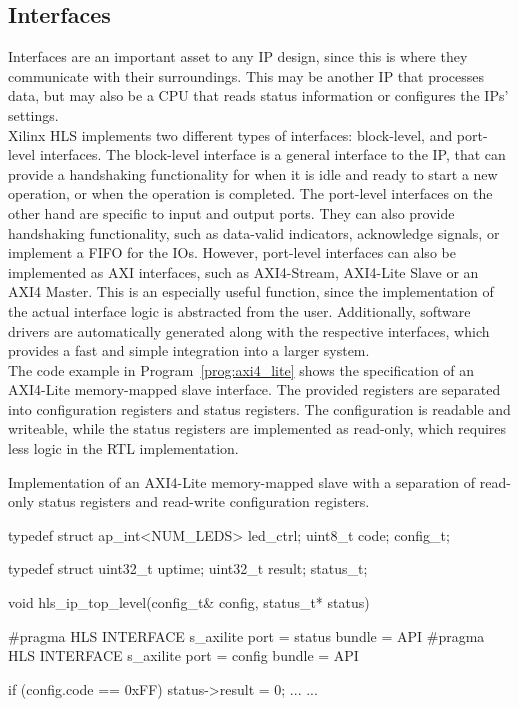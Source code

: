 \subsection{Interfaces}
\label{sec:hls:coding:interfaces}

Interfaces are an important asset to any IP design, since this is where they communicate with their surroundings.
This may be another IP that processes data, but may also be a CPU that reads status information or configures the IPs' settings.\\

Xilinx HLS implements two different types of interfaces: block-level, and port-level interfaces.
The block-level interface is a general interface to the IP, that can provide a handshaking functionality for when it is idle and ready to start a new operation, or when the operation is completed.
The port-level interfaces on the other hand are specific to input and output ports.
They can also provide handshaking functionality, such as data-valid indicators, acknowledge signals, or implement a FIFO for the IOs.
However, port-level interfaces can also be implemented as AXI interfaces, such as AXI4-Stream, AXI4-Lite Slave or an AXI4 Master.
This is an especially useful function, since the implementation of the actual interface logic is abstracted from the user.
Additionally, software drivers are automatically generated along with the respective interfaces, which provides a fast and simple integration into a larger system.\\

The code example in Program~\ref{prog:axi4_lite} shows the specification of an AXI4-Lite memory-mapped slave interface.
The provided registers are separated into configuration registers and status registers.
The configuration is readable and writeable, while the status registers are implemented as read-only, which requires less logic in the RTL implementation.\\

\begin{program}
  \caption{Implementation of an AXI4-Lite memory-mapped slave with a separation of read-only status registers and read-write configuration registers.}
  \label{prog:axi4_lite}
\begin{CppCode}
 typedef struct {
   ap_int<NUM_LEDS> led_ctrl;
   uint8_t code;
 } config_t;

 typedef struct {
   uint32_t uptime;
   uint32_t result;
 } status_t;

 void hls_ip_top_level(config_t& config,
                       status_t* status) {
     #pragma HLS INTERFACE s_axilite port = status bundle = API
     #pragma HLS INTERFACE s_axilite port = config bundle = API

     if (config.code == 0xFF) {
       status->result = 0;
       ...
     }
     ...
 }
\end{CppCode}
\end{program}

